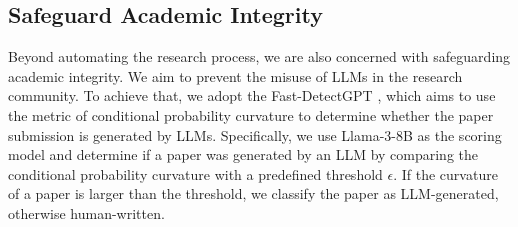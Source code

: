 \documentclass{article} %
\begin{document}


\subsection{Safeguard Academic Integrity}

Beyond automating the research process, we are also concerned with safeguarding academic integrity. We aim to prevent the misuse of LLMs in the research community. To achieve that, we adopt the Fast-DetectGPT \citep{bao2024fast}, which aims to use the metric of conditional probability curvature to determine whether the paper submission is generated by LLMs.  Specifically, we use Llama-3-8B \citep{dubey2024llama3herdmodels} as the scoring model and determine if a paper was generated by an LLM by comparing the conditional probability curvature with a predefined threshold $\epsilon$. If the curvature of a paper is larger than the threshold, we classify the paper as LLM-generated, otherwise human-written. 
\end{document}
